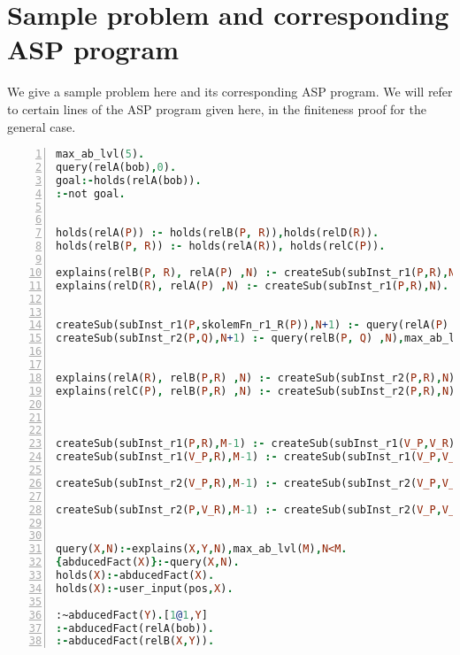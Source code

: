 \documentclass[sigconf]{acmart}
\begin{document}
\section{Sample problem and corresponding ASP program}\label{sec:sample_problem}
We give a sample problem here and its corresponding ASP program. We will refer to certain lines of the ASP program given here, in the finiteness proof for the general case. 
\begin{lstlisting}[language=Prolog, numbers=left]
max_ab_lvl(5).
query(relA(bob),0).
goal:-holds(relA(bob)).
:-not goal.


holds(relA(P)) :- holds(relB(P, R)),holds(relD(R)).
holds(relB(P, R)) :- holds(relA(R)), holds(relC(P)).

explains(relB(P, R), relA(P) ,N) :- createSub(subInst_r1(P,R),N).
explains(relD(R), relA(P) ,N) :- createSub(subInst_r1(P,R),N).


createSub(subInst_r1(P,skolemFn_r1_R(P)),N+1) :- query(relA(P) ,N),max_ab_lvl(M),N<M-1.
createSub(subInst_r2(P,Q),N+1) :- query(relB(P, Q) ,N),max_ab_lvl(M),N<M-1.


explains(relA(R), relB(P,R) ,N) :- createSub(subInst_r2(P,R),N).
explains(relC(P), relB(P,R) ,N) :- createSub(subInst_r2(P,R),N).



createSub(subInst_r1(P,R),M-1) :- createSub(subInst_r1(V_P,V_R),N), holds(relB(P, R)),max_ab_lvl(M).
createSub(subInst_r1(V_P,R),M-1) :- createSub(subInst_r1(V_P,V_R),N), holds(relD(R)),max_ab_lvl(M).

createSub(subInst_r2(V_P,R),M-1) :- createSub(subInst_r2(V_P,V_R),N), holds(relA(R)),max_ab_lvl(M).

createSub(subInst_r2(P,V_R),M-1) :- createSub(subInst_r2(V_P,V_R),N), holds(relC(P)),max_ab_lvl(M).


query(X,N):-explains(X,Y,N),max_ab_lvl(M),N<M.
{abducedFact(X)}:-query(X,N).
holds(X):-abducedFact(X).
holds(X):-user_input(pos,X).

:~abducedFact(Y).[1@1,Y]
:-abducedFact(relA(bob)).
:-abducedFact(relB(X,Y)).

\end{lstlisting}
\end{document}

